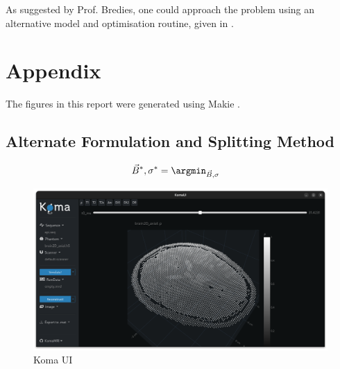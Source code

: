 \documentclass[10pt]{article}
\begin{document}
  As suggested by Prof. Bredies, one could approach the problem using an alternative model and optimisation routine, given in .

  \vspace{4cm}

  \vspace{2cm}

  \pagebreak
  \printbibliography
  \printnoidxglossary[type=acronym, title={Acronyms}]

  \pagebreak
  \appendix
  \section{Appendix}
  The figures in this report were generated using Makie \parencite{2021-makie}.

  \subsection{Alternate Formulation and Splitting Method}
  \label{sec:alt-formulation}
  \begin{align*}
    \vec{B}^*, \sigma^* & = \argmin_{\vec{B}, \sigma}
  \end{align*}

  \begin{figure}[H]
    \centering
    \includegraphics[width=\linewidth]{../figures/komaui.png}
    \caption{Koma UI}
    \label{fig:komaui}
  \end{figure}
\end{document}
